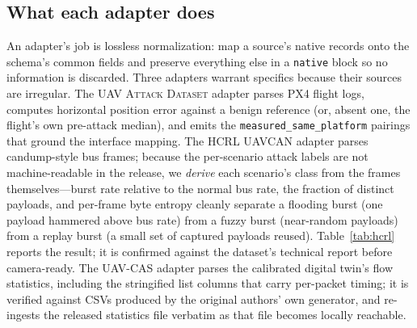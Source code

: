 \documentclass[conference]{IEEEtran}
\newcommand{\dataset}[1]{\textsc{#1}}
\newcommand{\code}[1]{\texttt{#1}}
\begin{document}
\subsection{What each adapter does}
An adapter's job is lossless normalization: map a source's native records onto
the schema's common fields and preserve everything else in a \code{native} block
so no information is discarded. Three adapters warrant specifics because their
sources are irregular. The \dataset{UAV Attack Dataset} adapter parses PX4 flight
logs, computes horizontal position error against a benign reference (or, absent
one, the flight's own pre-attack median), and emits the
\code{measured\_same\_platform} pairings that ground the interface mapping. The
\dataset{HCRL UAVCAN} adapter parses candump-style bus frames; because the
per-scenario attack labels are not machine-readable in the release, we
\emph{derive} each scenario's class from the frames themselves---burst rate
relative to the normal bus rate, the fraction of distinct payloads, and
per-frame byte entropy cleanly separate a flooding burst (one payload hammered
above bus rate) from a fuzzy burst (near-random payloads) from a replay burst
(a small set of captured payloads reused). Table~\ref{tab:hcrl} reports the
result; it is confirmed against the dataset's technical report before
camera-ready. The \dataset{UAV-CAS} adapter parses the calibrated digital
twin's flow statistics, including the stringified list columns that carry
per-packet timing; it is verified against CSVs produced by the original authors'
own generator, and re-ingests the released statistics file verbatim as that file
becomes locally reachable.

\begin{table}[t]
\centering
\caption{Real ingested corpus. Counts are from the schema-validated adapter
outputs (\code{results/ingest\_stats.csv}); every record validates against the
schema of \S\ref{sec:schema}. All values real-corpus except where a source's
release file was not yet locally reachable.}
\label{tab:ingest}
\small
\renewcommand{\arraystretch}{1.15}

\end{table}

\begin{table}[t]
\centering
\caption{Frame-derived attack classes for the \dataset{HCRL UAVCAN} scenarios.
Classes are inferred from burst rate, payload-distinct share, and byte entropy;
scenarios that exhibit more than one burst shape map to \code{collaborative}.}
\label{tab:hcrl}
\small
\renewcommand{\arraystretch}{1.1}

\end{table}
\end{document}
